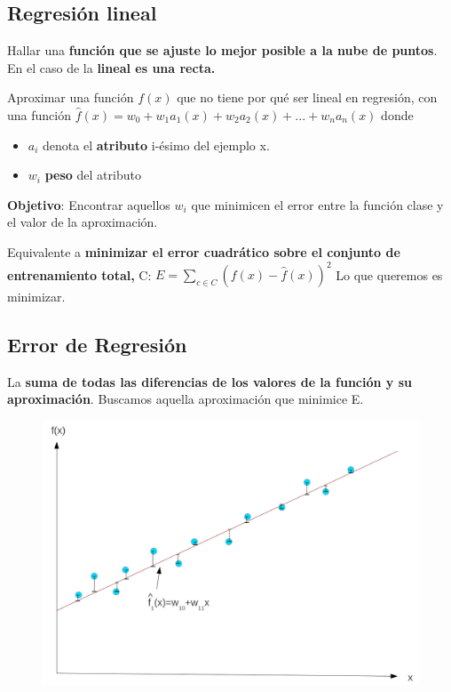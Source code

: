 \documentclass[12pt, twoside, openright]{report} %
\begin{document}
\subsection{Regresión lineal}

Hallar una \textbf{función que se ajuste lo mejor posible a la nube de
	puntos}. En el caso de la \textbf{lineal es una recta.}

Aproximar una función \(f(x)\) que no tiene por qué ser lineal en
regresión, con una función
\textbf{\(\hat{f}(x)= w_0 + w_1a_1(x)+ w_2a_2(x)+ ...+ w_na_n(x)\)}
donde

\begin{itemize}
	\item \(a_i\) denota el \textbf{atributo} i-ésimo del ejemplo x.
	\item \(w_i\) \textbf{peso} del atributo
\end{itemize}

\textbf{Objetivo}: Encontrar aquellos \(w_i\) que minimicen el error
entre la función clase y el valor de la aproximación.

Equivalente a \textbf{minimizar el error cuadrático sobre el conjunto de
	entrenamiento total, } C: \(E= \sum _{c \in C} (f(x)-\hat{f}(x))^2\) Lo
que queremos es minimizar.

\subsection{Error de Regresión}

La \textbf{suma de todas las diferencias de los valores de la función y
	su aproximación}. Buscamos aquella aproximación que minimice E.
\begin{figure}[H]
	{\includegraphics[scale=.10]{image-20210305212854142.png}}
\end{figure}
\end{document}
